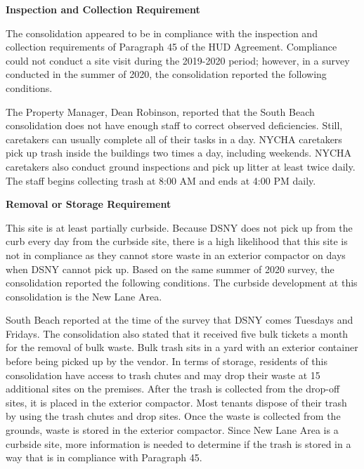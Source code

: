  

\textbf{Inspection and Collection Requirement} 

 

The consolidation appeared to be in compliance with the inspection and collection requirements of Paragraph 45 of the HUD Agreement. Compliance could not conduct a site visit during the 2019-2020 period; however, in a survey conducted in the summer of 2020, the consolidation reported the following conditions.

The Property Manager, Dean Robinson, reported that the South Beach consolidation does not have enough staff to correct observed deficiencies. Still, caretakers can usually complete all of their tasks in a day. NYCHA caretakers pick up trash inside the buildings two times a day, including weekends. NYCHA caretakers also conduct ground inspections and pick up litter at least twice daily. The staff begins collecting trash at 8:00 AM and ends at 4:00 PM daily.

\textbf{Removal or Storage Requirement}  

 

This site is at least partially curbside. Because DSNY does not pick up from the curb every day from the curbside site, there is a high likelihood that this site is not in compliance as they cannot store waste in an exterior compactor on days when DSNY cannot pick up.  Based on the same summer of  2020  survey, the consolidation reported the following conditions. The curbside development at this consolidation is the New Lane Area. 

 

South Beach reported at the time of the survey that DSNY comes Tuesdays and Fridays. The consolidation also stated that it received five bulk tickets a month for the removal of bulk waste.  Bulk trash sits in a yard with an exterior container before being picked up by the vendor. In terms of storage, residents of this consolidation have access to trash chutes and may drop their waste at 15 additional sites on the premises. After the trash is collected from the drop-off sites, it is placed in the exterior compactor. Most tenants dispose of their trash by using the trash chutes and drop sites. Once the waste is collected from the grounds, waste is stored in the exterior compactor. Since New Lane Area is a curbside site, more information is needed to determine if the trash is stored in a way that is in compliance with Paragraph 45.  

 

